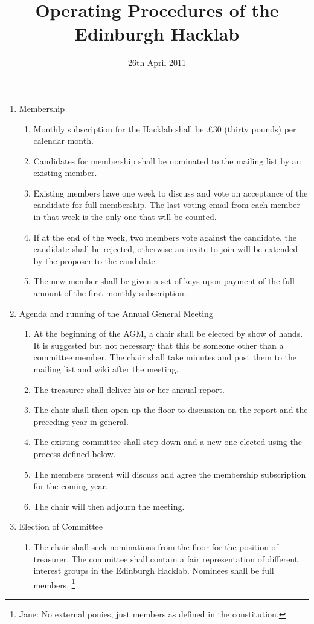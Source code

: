 \documentclass{article}
\title{Operating Procedures of the Edinburgh Hacklab}
\date{26th April 2011}
\begin{document}
\maketitle
\begin{enumerate}
\item Membership
  \begin{enumerate}
  \item Monthly subscription for the Hacklab shall be \pounds 30
    (thirty pounds) per calendar month.
  \item Candidates for membership shall be nominated to the mailing
    list by an existing member.
  \item Existing members have one week to discuss and vote on
    acceptance of the candidate for full membership. The last voting
    email from each member in that week is the only one that will be
    counted.
  \item If at the end of the week, two members vote against the
    candidate, the candidate shall be rejected, otherwise an invite to
    join will be extended by the proposer to the candidate.
  \item The new member shall be given a set of keys upon payment of
    the full amount of the first monthly subscription.
  \end{enumerate} %
\item Agenda and running of the Annual General Meeting
  \begin{enumerate}
  \item At the beginning of the AGM, a chair shall be elected by show
    of hands. It is suggested but not necessary that this be someone
    other than a committee member. The chair shall take minutes and
    post them to the mailing list and wiki after the meeting.
  \item The treasurer shall deliver his or her annual report.
  \item The chair shall then open up the floor to discussion on the
    report and the preceding year in general.
  \item The existing committee shall step down and a new one elected
    using the process defined below.
  \item The members present will discuss and agree the membership
    subscription for the coming year.
  \item The chair will then adjourn the meeting.
  \end{enumerate}
\item Election of Committee
  \begin{enumerate}
  \item The chair shall seek nominations from the floor for the
    position of treasurer.
     The committee shall contain a fair representation of different interest groups in the Edinburgh Hacklab. 
    Nominees shall be full members.
    \footnote{Jane: No external ponies, just members as defined in the constitution.}


\end{enumerate}
\end{enumerate}
\end{document}
